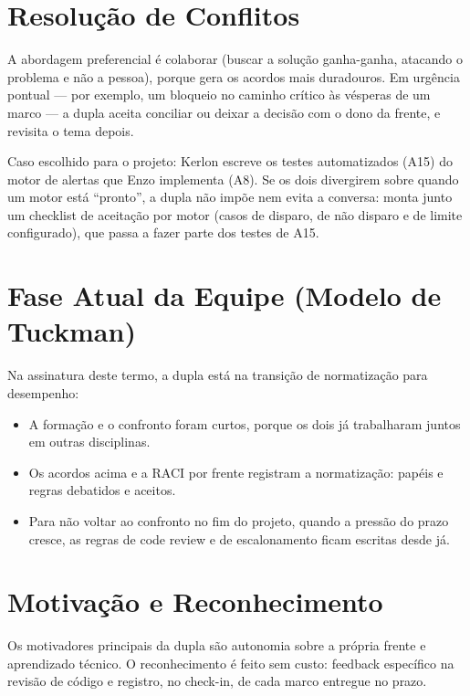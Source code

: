 \documentclass[11pt,a4paper]{article}
\begin{document}
\section{Resolução de Conflitos}
A abordagem preferencial é colaborar (buscar a solução ganha-ganha, atacando o problema e não a pessoa), porque gera os acordos mais duradouros. Em urgência pontual --- por exemplo, um bloqueio no caminho crítico às vésperas de um marco --- a dupla aceita conciliar ou deixar a decisão com o dono da frente, e revisita o tema depois.

\noindent Caso escolhido para o projeto: Kerlon escreve os testes automatizados (A15) do motor de alertas que Enzo implementa (A8). Se os dois divergirem sobre quando um motor está ``pronto'', a dupla não impõe nem evita a conversa: monta junto um checklist de aceitação por motor (casos de disparo, de não disparo e de limite configurado), que passa a fazer parte dos testes de A15.

\section{Fase Atual da Equipe (Modelo de Tuckman)}
Na assinatura deste termo, a dupla está na transição de normatização para desempenho:
\begin{itemize}[itemsep=2pt]
  \item A formação e o confronto foram curtos, porque os dois já trabalharam juntos em outras disciplinas.
  \item Os acordos acima e a RACI por frente registram a normatização: papéis e regras debatidos e aceitos.
  \item Para não voltar ao confronto no fim do projeto, quando a pressão do prazo cresce, as regras de code review e de escalonamento ficam escritas desde já.
\end{itemize}

\section{Motivação e Reconhecimento}
Os motivadores principais da dupla são autonomia sobre a própria frente e aprendizado técnico. O reconhecimento é feito sem custo: feedback específico na revisão de código e registro, no check-in, de cada marco entregue no prazo.
\end{document}
